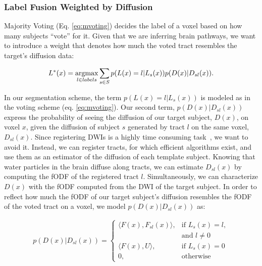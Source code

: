 \subsubsection{Label Fusion Weighted by Diffusion}
Majority Voting (Eq. \ref{eq:mvoting}) decides the label of a voxel based on
how many subjects ``vote'' for it. Given that we are inferring brain pathways,
we want to introduce a weight that denotes how much the voted tract resembles
the target's diffusion data: 

\begin{equation}
\label{eq:mvoting_weighted}
L^*(x) = \operatorname*{argmax}_{l \in labels} \sum_{s\in S} p(L(x) = l | L_s(x)) p(D(x) | D_{sl}(x)).
\end{equation}

In our segmentation scheme, the term $p(L(x) = l | L_s(x))$ is modeled as in
the voting scheme (eq. \ref{eq:mvoting}). Our second term, $p(D(x) | D_{sl}(x))$
express the probability of seeing the diffusion of our target subject, $D(x)$,
on voxel $x$, given the diffusion of subject $s$ generated by tract $l$ on
the same voxel, $D_{sl}(x)$. Since registering DWIs is a highly time consuming
task~\cite{ODonnell2017}, we want to avoid it. Instead, we can register tracts,
for which efficient algorithms exist, and use them as an estimator of the diffusion
of each template subject. Knowing that water particles in the brain diffuse along
tracts, we can estimate $D_{sl}(x)$ by computing the fODF of the registered tract
$l$. Simultaneously, we can characterize $D(x)$ with the fODF computed from
the DWI of the target subject. In order to reflect how much the fODF of
our target subject's diffusion resembles the fODF of the voted tract on a voxel,
we model $p(D(x) | D_{sl}(x))$ as:

\begin{equation}
\label{eq:inner_odf}
\begin{aligned}
    p(D(x) | D_{sl}(x)) = 
    \begin{cases}
        \langle F(x), F_{sl}(x) \rangle,& \text{if } L_s(x) = l,\\
                        & \text{and } l \neq 0 \\
        \langle F(x), U \rangle,& \text{if } L_s(x) = 0 \\
        0,& \text{otherwise}
    \end{cases} \\
\end{aligned}
\end{equation}

